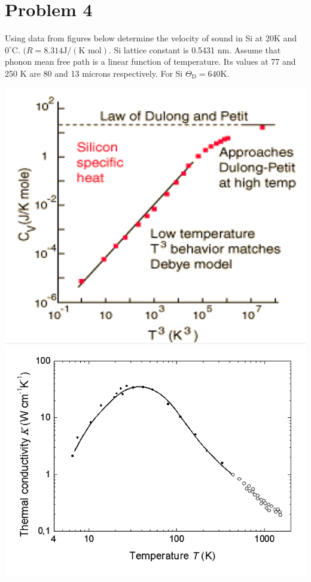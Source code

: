 \documentclass{article}
\begin{document}
\section*{Problem 4}
Using data from figures below determine the velocity of sound in Si at 20K and $0^{\circ}$C. $(R = 8.314 \text{J}/(\text{K mol})$. Si lattice constant is 0.5431 nm. Assume that phonon mean free path is a linear function of temperature. Its values at 77 and 250 K are 80 and 13 microns respectively. For Si $\Theta_{\text{D}} = 640$K.
\begin{center}
    \includegraphics[scale = 0.6]{dulong.PNG}
    \newline
    \includegraphics[scale = 0.6]{thermal conductivity.PNG}
\end{center}
\end{document}
